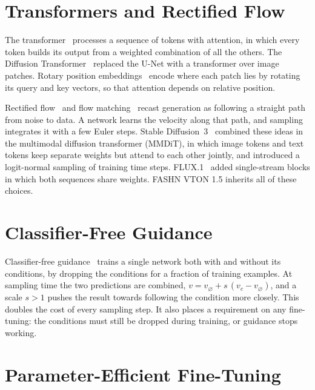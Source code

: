 \section{Transformers and Rectified Flow}

The transformer~\cite{transformer} processes a sequence of tokens with attention, in which every token builds its output from a weighted combination of all the others. The Diffusion Transformer~\cite{dit} replaced the U-Net with a transformer over image patches. Rotary position embeddings~\cite{rope} encode where each patch lies by rotating its query and key vectors, so that attention depends on relative position.

Rectified flow~\cite{rectflow} and flow matching~\cite{flowmatch} recast generation as following a straight path from noise to data. A network learns the velocity along that path, and sampling integrates it with a few Euler steps. Stable Diffusion~3~\cite{sd3} combined these ideas in the multimodal diffusion transformer (MMDiT), in which image tokens and text tokens keep separate weights but attend to each other jointly, and introduced a logit-normal sampling of training time steps. FLUX.1~\cite{flux} added single-stream blocks in which both sequences share weights. FASHN VTON 1.5 inherits all of these choices.

\section{Classifier-Free Guidance}

Classifier-free guidance~\cite{cfg} trains a single network both with and without its conditions, by dropping the conditions for a fraction of training examples. At sampling time the two predictions are combined, $v = v_\varnothing + s\,(v_c - v_\varnothing)$, and a scale $s > 1$ pushes the result towards following the condition more closely. This doubles the cost of every sampling step. It also places a requirement on any fine-tuning: the conditions must still be dropped during training, or guidance stops working.

\section{Parameter-Efficient Fine-Tuning}

